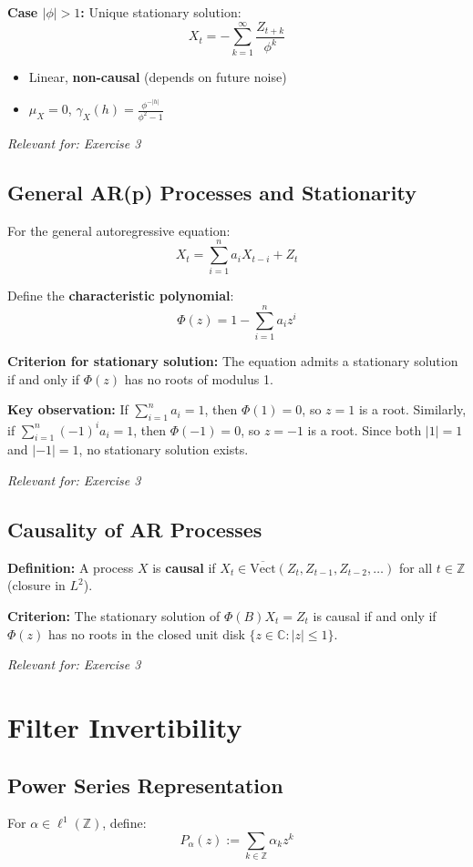 \documentclass[a4paper, 12pt]{article}
\begin{document}
\textbf{Case $|\phi| > 1$:} Unique stationary solution:
\[
X_t = -\sum_{k=1}^\infty \frac{Z_{t+k}}{\phi^k}
\]
\begin{itemize}
\item Linear, \textbf{non-causal} (depends on future noise)
\item $\mu_X = 0$, $\gamma_X(h) = \frac{\phi^{-|h|}}{\phi^2-1}$
\end{itemize}

\textit{Relevant for: Exercise 3}

\subsection{General AR(p) Processes and Stationarity}
For the general autoregressive equation:
\[
X_t = \sum_{i=1}^n a_i X_{t-i} + Z_t
\]

Define the \textbf{characteristic polynomial}:
\[
\Phi(z) = 1 - \sum_{i=1}^n a_i z^i
\]

\textbf{Criterion for stationary solution:} The equation admits a stationary solution if and only if $\Phi(z)$ has no roots of modulus 1.

\textbf{Key observation:} If $\sum_{i=1}^n a_i = 1$, then $\Phi(1) = 0$, so $z=1$ is a root. Similarly, if $\sum_{i=1}^n (-1)^i a_i = 1$, then $\Phi(-1) = 0$, so $z=-1$ is a root. Since both $|1| = 1$ and $|-1| = 1$, no stationary solution exists.

\textit{Relevant for: Exercise 3}

\subsection{Causality of AR Processes}
\textbf{Definition:} A process $X$ is \textbf{causal} if $X_t \in \overline{\text{Vect}}(Z_t, Z_{t-1}, Z_{t-2}, \ldots)$ for all $t \in \mathbb{Z}$ (closure in $L^2$).

\textbf{Criterion:} The stationary solution of $\Phi(B)X_t = Z_t$ is causal if and only if $\Phi(z)$ has no roots in the closed unit disk $\{z \in \mathbb{C}: |z| \leq 1\}$.

\textit{Relevant for: Exercise 3}

\section{Filter Invertibility}

\subsection{Power Series Representation}
For $\alpha \in \ell^1(\mathbb{Z})$, define:
\[
P_\alpha(z) := \sum_{k \in \mathbb{Z}} \alpha_k z^k
\]
\end{document}
